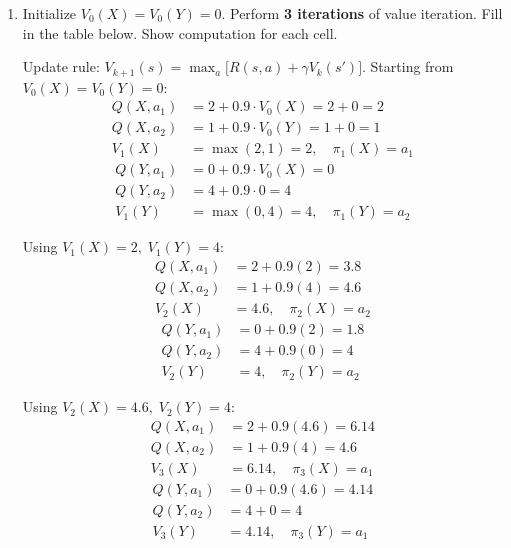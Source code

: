\documentclass[12pt]{article}
\begin{document}
\begin{enumerate}[label=(\alph*)]
\item Initialize $V_0(X) = V_0(Y) = 0$. Perform \textbf{3 iterations} of value iteration. Fill in the table below. Show computation for each cell.

\begin{stepbox}
Update rule: $V_{k+1}(s) = \max_a \big[R(s,a) + \gamma V_k(s')\big]$. Starting from $V_0(X) = V_0(Y) = 0$:
\begin{align*}
Q(X, a_1) &= 2 + 0.9 \cdot V_0(X) = 2 + 0 = 2 \\
Q(X, a_2) &= 1 + 0.9 \cdot V_0(Y) = 1 + 0 = 1 \\
V_1(X) &= \max(2, 1) = 2, \quad \pi_1(X) = a_1
\end{align*}
\begin{align*}
Q(Y, a_1) &= 0 + 0.9 \cdot V_0(X) = 0 \\
Q(Y, a_2) &= 4 + 0.9 \cdot 0 = 4 \\
V_1(Y) &= \max(0, 4) = 4, \quad \pi_1(Y) = a_2
\end{align*}
\end{stepbox}

\begin{stepbox}[Iteration 2]
Using $V_1(X) = 2,\; V_1(Y) = 4$:
\begin{align*}
Q(X, a_1) &= 2 + 0.9(2) = 3.8 \\
Q(X, a_2) &= 1 + 0.9(4) = 4.6 \\
V_2(X) &= 4.6, \quad \pi_2(X) = a_2
\end{align*}
\begin{align*}
Q(Y, a_1) &= 0 + 0.9(2) = 1.8 \\
Q(Y, a_2) &= 4 + 0.9(0) = 4 \\
V_2(Y) &= 4, \quad \pi_2(Y) = a_2
\end{align*}
\end{stepbox}

\begin{stepbox}[Iteration 3]
Using $V_2(X) = 4.6,\; V_2(Y) = 4$:
\begin{align*}
Q(X, a_1) &= 2 + 0.9(4.6) = 6.14 \\
Q(X, a_2) &= 1 + 0.9(4) = 4.6 \\
V_3(X) &= 6.14, \quad \pi_3(X) = a_1
\end{align*}
\begin{align*}
Q(Y, a_1) &= 0 + 0.9(4.6) = 4.14 \\
Q(Y, a_2) &= 4 + 0 = 4 \\
V_3(Y) &= 4.14, \quad \pi_3(Y) = a_1
\end{align*}
\end{stepbox}


\end{enumerate}
\end{document}
